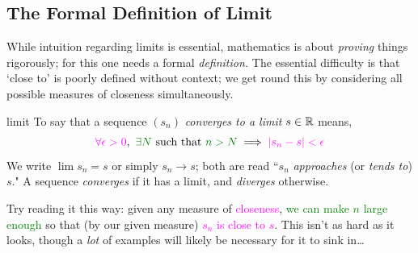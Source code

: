 \clearpage


\subsection{The Formal Definition of Limit}\label{sec:limitdef}

While intuition regarding limits is essential, mathematics is about \emph{proving} things rigorously; for this one needs a formal \emph{definition.} The essential difficulty is that `close to' is poorly defined without context; we get round this by considering all possible measures of closeness simultaneously.

\begin{defn}{}{limit}
	To say that a sequence $(s_n)$ \emph{converges to a limit $s\in\mathbb{R}$} means,\footnotemark{}
	\[
		\textcolor{Magenta}{\forall\epsilon>0},\ \textcolor{Green}{\exists N}\ \text{such that}\ \textcolor{Green}{n>N}\implies \textcolor{Magenta}{\nm{s_n-s}<\epsilon}
	\]
	We write $\lim s_n=s$ or simply $s_n\to s$; both are read ``$s_n$ \emph{approaches} (or \emph{tends to}) $s$."\smallbreak
	A sequence \emph{converges} if it has a limit, and \emph{diverges} otherwise.
\end{defn}


Try reading it this way: given any measure of \textcolor{Magenta}{closeness}, \textcolor{Green}{we can make $n$ large enough} so that (by our given measure) \textcolor{Magenta}{$s_n$ is close to $s$}. This isn't as hard as it looks, though a \emph{lot} of examples will likely be necessary for it to sink in\ldots


